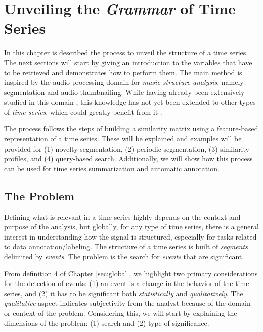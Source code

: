 
%

\chapter{Unveiling the \textit{Grammar} of Time Series}
\label{cha:segmentation}

In this chapter is described the process to unveil the structure of a time series. The next sections will start by giving an introduction to the variables that have to be retrieved and demonstrates how to perform them. The main method is inspired by the audio-processing domain for \textit{music structure analysis}, namely segmentation and audio-thumbnailing. While having already been extensively studied in this domain \cite{fmp1, audiolabs1, audiolabs2, cpd_audio}, this knowledge has not yet been extended to other types of \textit{time series}, which could greatly benefit from it \cite{muller_music_health}. 
\par
The process follows the steps of building a similarity matrix using a feature-based representation of a time series. These will be explained and examples will be provided for (1) novelty segmentation, (2) periodic segmentation, (3) similarity profiles, and (4) query-based search. Additionally, we will show how this process can be used for time series summarization and automatic annotation.

\section{The Problem}

Defining what is relevant in a time series highly depends on the context and purpose of the analysis, but globally, for any type of time series, there is a general interest in understanding how the signal is structured, especially for tasks related to data annotation/labeling. The structure of a time series is built of \textit{segments} delimited by \textit{events}. The problem is the search for \textit{events} that are significant. 
\par
From definition 4 of Chapter \ref{sec:global}, we highlight two primary considerations for the detection of events: (1) an event is a change in the behavior of the time series, and (2) it has to be significant both \textit{statistically} and \textit{qualitatively}. The \textit{qualitative} aspect indicates subjectivity from the analyst because of the domain or context of the problem. Considering this, we will start by explaining the dimensions of the problem: (1) search and (2) type of significance. 


